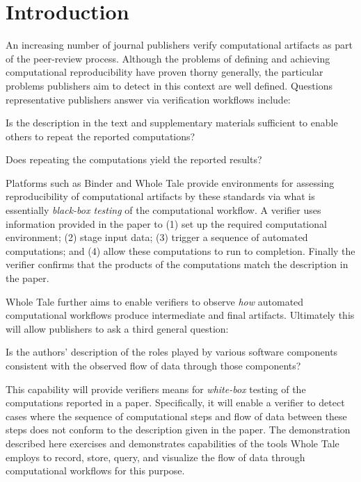 \section{Introduction}

An increasing number of journal publishers verify computational artifacts as part of the peer-review process. Although the problems of defining and achieving computational reproducibility have proven thorny generally, the particular problems publishers aim to detect in this context are well defined. Questions representative publishers answer via verification workflows include:

\begin{itemize}

\tinyitem Is the description in the text and supplementary materials sufficient to enable others to repeat the reported computations?

\tinyitem Does repeating the computations yield the reported results?

\end{itemize}

Platforms such as Binder \cite{Binder_2018} and Whole Tale  \cite{brinckman2019computing} provide environments for assessing reproducibility of computational artifacts by these standards via what is essentially \emph{black-box testing} of the computational workflow. A verifier uses information provided in the paper to (1) set up the required computational environment; (2) stage input data; (3) trigger a sequence of automated computations; and (4) allow these computations to run to completion. Finally the verifier confirms that the products of the computations match the description in the paper.

Whole Tale further aims to enable verifiers to observe \emph{how} automated computational workflows produce intermediate and final artifacts. Ultimately this will allow publishers to ask a third general question:

\begin{itemize}

\tinyitem Is the authors' description of the roles played by various software components consistent with the observed flow of data through those components?

\end{itemize}

This capability will provide verifiers means for \emph{white-box} testing of the computations reported in a paper. Specifically, it will enable a verifier to detect cases where the sequence of computational steps and flow of data between these steps does not conform to the description given in the paper. The demonstration described here exercises and demonstrates capabilities of the tools Whole Tale employs to record, store, query, and visualize the flow of data through computational workflows for this purpose.









